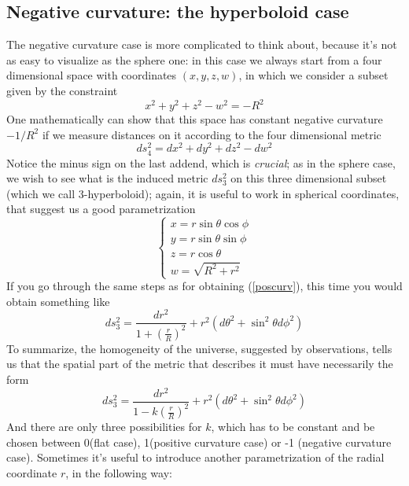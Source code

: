 \subsection{Negative curvature: the hyperboloid case}
The negative curvature case is more complicated to think about, because it's not as easy to visualize as the sphere one: in this case we always start from a four dimensional space with coordinates $(x,y,z,w)$, in which we consider a subset given by the constraint
\begin{equation}
x^2+y^2+z^2-w^2=-R^2
\end{equation}
One mathematically can show that this space has constant negative curvature $-1/R^2$ if we measure distances on it according to the four dimensional metric 
\begin{equation}
ds_4^2=dx^2+dy^2+dz^2-dw^2
\end{equation}
Notice the minus sign on the last addend, which is \textit{crucial}; as in the sphere case, we wish to see what is the induced metric $ds^2_3$ on this three dimensional subset (which we call 3-hyperboloid); again, it is useful to work in spherical coordinates, that suggest us a good parametrization
\begin{displaymath}
\left \{ \begin{array}{l}x=r\sin{\theta}\cos{\phi} \\ 
y=r\sin{\theta}\sin{\phi} \\ 
z=r\cos{\theta} \\
w= \sqrt{R^2+r^2} \end{array}  \right.  
\end{displaymath}
If you go through the same steps as for obtaining (\ref{poscurv}), this time you would obtain something like
\begin{equation}
\label{negcurv}
ds_3^2=\frac{dr^2}{1+\left(\frac{r}{R}\right)^2} + r^2(d\theta^2 + \sin^2{\theta}d\phi^2)
\end{equation}
To summarize, the homogeneity of the universe, suggested by observations, tells us that the spatial part of the metric that describes it must have necessarily the form 
\begin{equation}
\label{gencurv}
ds_3^2=\frac{dr^2}{1-k\left(\frac{r}{R}\right)^2} + r^2(d\theta^2 + \sin^2{\theta}d\phi^2)
\end{equation}
And there are only three possibilities for $k$, which has to be constant and be chosen between 0(flat case), 1(positive curvature case) or -1 (negative curvature case). Sometimes it's useful to introduce another parametrization of the radial coordinate $r$, in the following way: 
